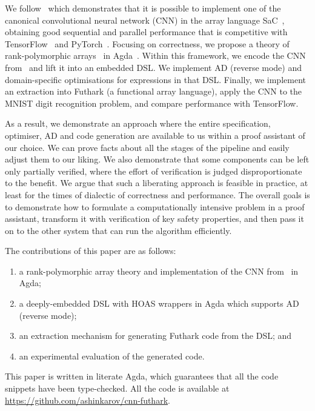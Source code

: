 We follow~\cite{cnn-array} which demonstrates that it is possible to implement
one of the canonical convolutional neural network (CNN) in the array language
SaC~\cite{sac1, sac2}, obtaining good sequential and parallel performance that
is competitive with TensorFlow~\cite{ad-tf} and PyTorch~\cite{ad-pytorch}.
Focusing on correctness, we propose a theory of rank-polymorphic
arrays~\cite{rank-poly} in Agda~\cite{agda-2-6-3}. Within this framework, we
encode the CNN from~\cite{cnn-array} and lift it into an embedded DSL. We
implement AD (reverse mode) and domain-specific optimisations for expressions in
that DSL. Finally, we implement an extraction into Futhark (a functional array
language), apply the CNN to the MNIST digit recognition problem, and compare
performance with TensorFlow.

As a result, we demonstrate an approach where the entire specification,
optimiser, AD and code generation are available to us within a proof assistant
of our choice. We can prove facts about all the stages of the pipeline and
easily adjust them to our liking. We also demonstrate that some components can
be left only partially verified, where the effort of verification is judged
disproportionate to the benefit. We argue that such a liberating approach is
feasible in practice, at least for the times of dialectic of correctness and
performance. The overall goals is to demonstrate how to formulate a
computationally intensive problem in a proof assistant, transform it with
verification of key safety properties, and then pass it on to the other system
that can run the algorithm efficiently.

The contributions of this paper are as follows:
\begin{enumerate}
  \item a rank-polymorphic array theory and implementation of
        the CNN from~\cite{cnn-array} in Agda;
  \item a deeply-embedded DSL with HOAS wrappers in Agda which supports AD (reverse mode);
  \item an extraction mechanism for generating Futhark code from the DSL; and
  \item an experimental evaluation of the generated code.
\end{enumerate}

This paper is written in literate Agda, which guarantees that all the code
snippets have been type-checked.  All the code is available at \url{https://github.com/ashinkarov/cnn-futhark}.


